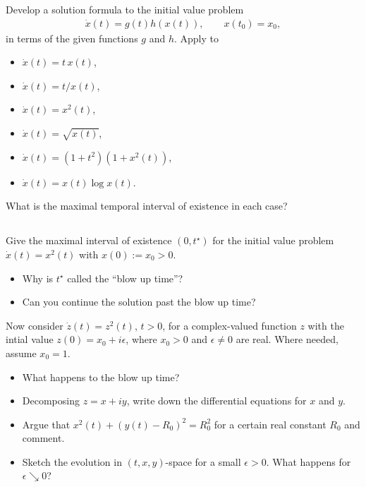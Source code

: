 \documentclass[12pt,a4paper]{article}
\begin{document}
    Develop a solution formula to
    the initial value problem
    \begin{align}
        \dot{x}(t) = g(t) h(x(t)),
        \qquad
        x(t_0) = x_0
        ,
    \end{align}
    in terms of the given functions $g$ and $h$.
    Apply to
    \begin{itemize}
    \item
        $\dot{x}(t) = t \, x(t)$,
    \item
        $\dot{x}(t) = t / x(t)$,
    \item
        $\dot{x}(t) = x^2(t)$,
    \item  
        $\dot{x}(t) = \sqrt{ x(t) }$,
    \item
        $\dot{x}(t) = (1 + t^2) (1 + x^2(t))$,
    \item
        $\dot{x}(t) = x(t) \log x(t)$.
    \end{itemize}
    What is the maximal temporal interval of existence in each case?

    
    \subsection{}
    
    Give the maximal interval of existence $(0, t^\star)$
    for the initial value problem
    $\dot{x}(t) = x^2(t)$
    with
    $x(0) := x_0 > 0$.
    
    \begin{itemize}
    \item 
        Why is $t^\star$ called the ``blow up time''?
    \item
        Can you continue the solution past the blow up time?
    \end{itemize}

    
    Now consider 
    $\dot{z}(t) = z^2(t)$, $t > 0$,
    for a complex-valued function $z$
    with the intial value
    $z(0) = x_0 + i \epsilon$,
    where $x_0 > 0$ and $\epsilon \neq 0$ are real.
    Where needed, assume $x_0 = 1$.

    \begin{itemize}
    \item 
        What happens to the blow up time?
    \item
        Decomposing $z = x + i y$,
        write down the differential equations for $x$ and $y$.
    \item
        Argue that $x^2(t) + (y(t) - R_0)^2 = R_0^2$
        for a certain real constant $R_0$
        and
        comment.
    \item
        Sketch the evolution in $(t, x, y)$-space 
        for a small $\epsilon > 0$.
        What happens for $\epsilon \searrow 0$?
    \end{itemize}
\end{document}
